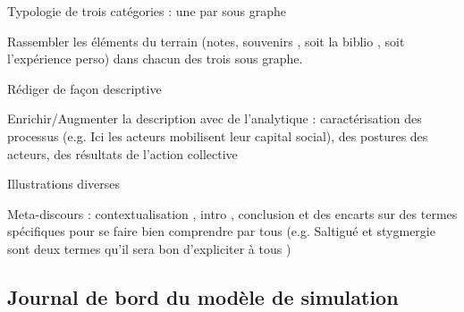 Typologie de trois catégories : une par sous graphe

Rassembler les éléments du terrain (notes, souvenirs , soit la biblio , soit l'expérience perso) dans chacun des trois sous graphe.

Rédiger de façon descriptive

Enrichir/Augmenter la description avec de l'analytique  : caractérisation des processus (e.g. Ici les acteurs mobilisent leur capital social), des postures des acteurs, des résultats de l'action collective


Illustrations diverses

Meta-discours : contextualisation , intro , conclusion et des encarts sur des termes spécifiques pour se faire bien comprendre par tous (e.g. Saltigué et stygmergie sont deux termes qu'il sera bon d'expliciter à tous )


\subsection{Journal de bord du modèle de simulation}



